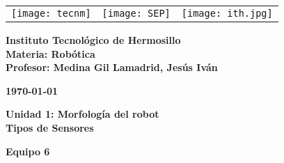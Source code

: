 \begin{titlepage}
	\centering
	\begin{tabular}{@{}p{} p{} p{}@{}}
		\texttt{[image: tecnm]} & 
		\centering \texttt{[image: SEP]} & 
		\raggedleft \texttt{[image: ith.jpg]} \\
	\end{tabular}
	
	\vspace{2em}
	
	\noindent
	\begin{minipage}[t]{0.48\textwidth}
		\raggedright
		\small \textbf{%
			Instituto Tecnológico de Hermosillo\\
			Materia: Robótica\\
			Profesor: Medina Gil Lamadrid, Jesús Iván%
		}
	\end{minipage}%
	\hfill
	\begin{minipage}[t]{0.48\textwidth}
		\raggedleft
		\small \textbf{\today}
	\end{minipage}
	
	\vspace{2em}
	
	{\large \textbf{Unidad 1: Morfología del robot}}\\
	{\Huge \textbf{Tipos de Sensores}}
		
	\vspace{1em}
	
	\begin{center}
		{\Large \textbf{Equipo 6}}
	\end{center}
	
	\vspace{1em}
	

\end{titlepage}
